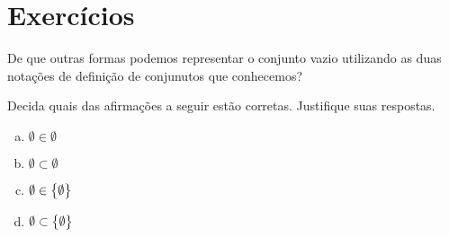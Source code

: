 \section{Exercícios}

\begin{exercise}
\label{exercicio-conjuntos-notacao}
	De que outras formas podemos representar o conjunto vazio utilizando as duas notações de definição de conjunutos que conhecemos?
\end{exercise}


\begin{exercise}
	Decida quais das afirmações a seguir estão corretas. Justifique suas respostas.
	\begin{enumerate}[a.]
		\item $\emptyset \in \emptyset$	
		\item $\emptyset \subset \emptyset$
		\item $\emptyset \in \left\{\emptyset\right\}$
		\item $\emptyset \subset \left\{\emptyset\right\}$
	\end{enumerate}
\end{exercise}


